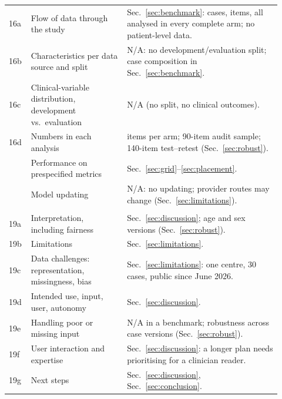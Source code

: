 \documentclass[11pt]{article}
\begin{document}
{\begin{longtable}{>{\raggedright\arraybackslash}p{0.06\linewidth}
  >{\raggedright\arraybackslash}p{0.33\linewidth}
  >{\raggedright\arraybackslash}p{0.53\linewidth}}
16a & Flow of data through the study & Sec.~\ref{sec:benchmark}: \nCases{} cases, \nItems{} items,
  all analysed in every complete arm; no patient-level data.\\
16b & Characteristics per data source and split & N/A: no development/evaluation split; case
  composition in Sec.~\ref{sec:benchmark}.\\
16c & Clinical-variable distribution, development vs.\ evaluation & N/A (no split, no clinical
  outcomes).\\
16d & Numbers in each analysis & \nItems{} items per arm; 90-item audit sample; 140-item test--retest
  (Sec.~\ref{sec:robust}).\\
17 & Performance on prespecified metrics & Sec.~\ref{sec:grid}--\ref{sec:placement}.\\
18 & Model updating & N/A: no updating; provider routes may change (Sec.~\ref{sec:limitations}).\\
\multicolumn{3}{l}{\textit{Discussion}}\\
19a & Interpretation, including fairness & Sec.~\ref{sec:discussion}; age and sex versions
  (Sec.~\ref{sec:robust}).\\
19b & Limitations & Sec.~\ref{sec:limitations}.\\
19c & Data challenges: representation, missingness, bias & Sec.~\ref{sec:limitations}: one centre,
  30 cases, public since June 2026.\\
19d & Intended use, input, user, autonomy & Sec.~\ref{sec:discussion}.\\
19e & Handling poor or missing input & N/A in a benchmark; robustness across case versions
  (Sec.~\ref{sec:robust}).\\
19f & User interaction and expertise & Sec.~\ref{sec:discussion}: a longer plan needs prioritising
  for a clinician reader.\\
19g & Next steps & Sec.~\ref{sec:discussion}, Sec.~\ref{sec:conclusion}.\\
\bottomrule
\end{longtable}
}
\end{document}
